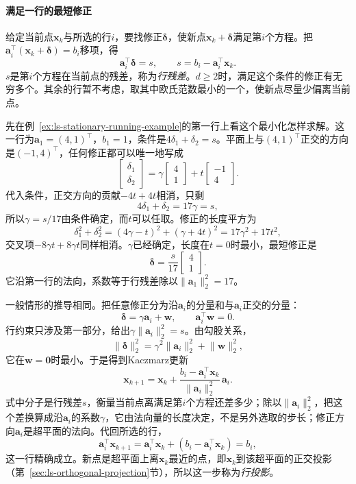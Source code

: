 \paragraph{满足一行的最短修正}
给定当前点$\bm x_k$与所选的行$i$，要找修正$\bm\delta$，使新点$\bm x_k+\bm\delta$满足第$i$个方程。把$\bm a_i^\top(\bm x_k+\bm\delta)=b_i$移项，得
\[
 \bm a_i^\top\bm\delta=s,\qquad s=b_i-\bm a_i^\top\bm x_k .
\]
$s$是第$i$个方程在当前点的残差，称为\emph{行残差}。$d\geq2$时，满足这个条件的修正有无穷多个。其余的行暂不考虑，取其中欧氏范数最小的一个，使新点尽量少偏离当前点。

先在例~\ref{ex:ls-stationary-running-example}的第一行上看这个最小化怎样求解。这一行为$\bm a_1=(4,1)^\top$，$b_1=1$，条件是$4\delta_1+\delta_2=s$。平面上与$(4,1)^\top$正交的方向是$(-1,4)^\top$，任何修正都可以唯一地写成
\[
 \begin{bmatrix}\delta_1\\\delta_2\end{bmatrix}
 =\gamma\begin{bmatrix}4\\1\end{bmatrix}+t\begin{bmatrix}-1\\4\end{bmatrix}.
\]
代入条件，正交方向的贡献$-4t+4t$相消，只剩
\[
 4\delta_1+\delta_2=17\gamma=s ,
\]
所以$\gamma=s/17$由条件确定，而$t$可以任取。修正的长度平方为
\[
 \delta_1^2+\delta_2^2=(4\gamma-t)^2+(\gamma+4t)^2=17\gamma^2+17t^2 ,
\]
交叉项$-8\gamma t+8\gamma t$同样相消。$\gamma$已经确定，长度在$t=0$时最小，最短修正是
\[
 \bm\delta=\frac{s}{17}\begin{bmatrix}4\\1\end{bmatrix}.
\]
它沿第一行的法向，系数等于行残差除以$\lVert\bm a_1\rVert_2^2=17$。

一般情形的推导相同。把任意修正分为沿$\bm a_i$的分量和与$\bm a_i$正交的分量：
\[
 \bm\delta=\gamma\bm a_i+\bm w,\qquad \bm a_i^\top\bm w=0 .
\]
行约束只涉及第一部分，给出$\gamma\lVert\bm a_i\rVert_2^2=s$。由勾股关系，
\[
 \lVert\bm\delta\rVert_2^2=\gamma^2\lVert\bm a_i\rVert_2^2+\lVert\bm w\rVert_2^2 ,
\]
它在$\bm w=\bm0$时最小。于是得到Kaczmarz更新
\begin{equation}
 \bm x_{k+1}=\bm x_k+\frac{b_i-\bm a_i^\top\bm x_k}{\lVert\bm a_i\rVert_2^2}\,\bm a_i .
 \label{eq:ls-kaczmarz-update}
\end{equation}
式中分子是行残差$s$，衡量当前点离满足第$i$个方程还差多少；除以$\lVert\bm a_i\rVert_2^2$，把这个差换算成沿$\bm a_i$的系数$\gamma$，它由法向量的长度决定，不是另外选取的步长；修正方向$\bm a_i$是超平面的法向。代回所选的行，
\[
 \bm a_i^\top\bm x_{k+1}=\bm a_i^\top\bm x_k+(b_i-\bm a_i^\top\bm x_k)=b_i ,
\]
这一行精确成立。新点是超平面上离$\bm x_k$最近的点，即$\bm x_k$到该超平面的正交投影（第~\ref{sec:ls-orthogonal-projection}节），所以这一步称为\emph{行投影}。

